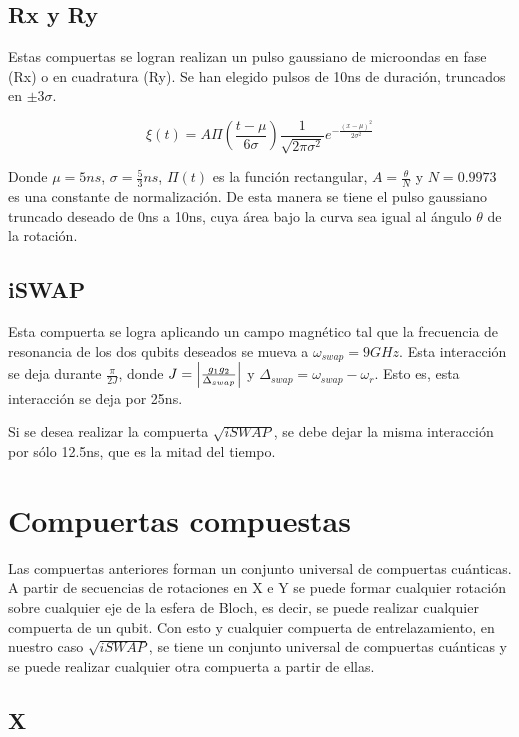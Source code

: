 \subsection{Rx y Ry}

Estas compuertas se logran realizan un pulso gaussiano de microondas en fase (Rx) o en cuadratura (Ry). Se han elegido pulsos de 10ns de duración, truncados en $\pm 3 \sigma$.

\begin{equation}
    \xi(t) = A \Pi\left(\frac{t-\mu}{6\sigma}\right) \frac{1}{\sqrt{2 \pi \sigma^2}} e^{-\frac{(x-\mu)^2}{2 \sigma^2}}
\end{equation}

Donde $\mu = 5ns$, $\sigma = \frac{5}{3} ns$, $\Pi(t)$ es la función rectangular, $A = \frac{\theta}{N}$ y $N = 0.9973$ es una constante de normalización. De esta manera se tiene el pulso gaussiano truncado deseado de 0ns a 10ns, cuya área bajo la curva sea igual al ángulo $\theta$ de la rotación.

\subsection{iSWAP}

Esta compuerta se logra aplicando un campo magnético tal que la frecuencia de resonancia de los dos qubits deseados se mueva a $\omega_{swap} = 9GHz$. Esta interacción se deja durante $\frac{\pi}{2 J}$, donde $J = \abs{\frac{g_1 g_2}{\Delta_{swap}}}$ y $\Delta_{swap} = \omega_{swap} - \omega_r$. Esto es, esta interacción se deja por 25ns.

Si se desea realizar la compuerta $\sqrt{iSWAP}$, se debe dejar la misma interacción por sólo 12.5ns, que es la mitad del tiempo.

\section{Compuertas compuestas}

Las compuertas anteriores forman un conjunto universal de compuertas cuánticas. A partir de secuencias de rotaciones en X e Y se puede formar cualquier rotación sobre cualquier eje de la esfera de Bloch, es decir, se puede realizar cualquier compuerta de un qubit. Con esto y cualquier compuerta de entrelazamiento, en nuestro caso $\sqrt{iSWAP}$, se tiene un conjunto universal de compuertas cuánticas y se puede realizar cualquier otra compuerta a partir de ellas.

\subsection{X}


